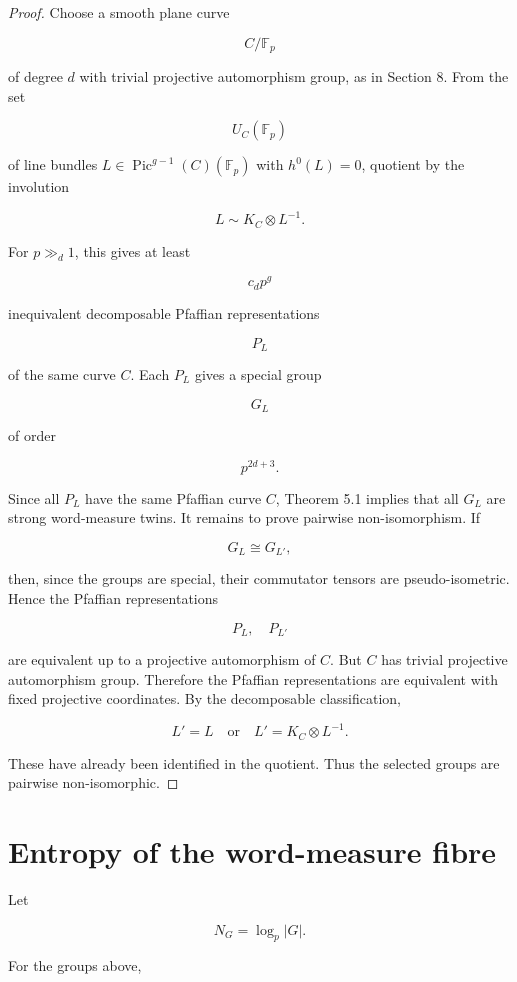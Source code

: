 \documentclass[11pt]{article}
\begin{document}
\begin{proof}
Choose a smooth plane curve

\[
C/\mathbb F_p
\]

of degree $d$ with trivial projective automorphism group, as in Section 8. From the set

\[
U_C(\mathbb F_p)
\]

of line bundles $L\in\operatorname{Pic}^{g-1}(C)(\mathbb F_p)$ with $h^0(L)=0$, quotient by the involution

\[
L\sim K_C\otimes L^{-1}.
\]

For $p\gg_d1$, this gives at least

\[
c_d p^g
\]

inequivalent decomposable Pfaffian representations

\[
P_L
\]

of the same curve $C$. Each $P_L$ gives a special group

\[
G_L
\]

of order

\[
p^{2d+3}.
\]

Since all $P_L$ have the same Pfaffian curve $C$, Theorem 5.1 implies that all $G_L$ are strong word-measure twins. It remains to prove pairwise non-isomorphism. If

\[
G_L\cong G_{L'},
\]

then, since the groups are special, their commutator tensors are pseudo-isometric. Hence the Pfaffian representations

\[
P_L,\quad P_{L'}
\]

are equivalent up to a projective automorphism of $C$. But $C$ has trivial projective automorphism group. Therefore the Pfaffian representations are equivalent with fixed projective coordinates. By the decomposable classification,

\[
L'=L
\quad\text{or}\quad
L'=K_C\otimes L^{-1}.
\]

These have already been identified in the quotient. Thus the selected groups are pairwise non-isomorphic.

\end{proof}

\section{Entropy of the word-measure fibre}

Let

\[
N_G=\log_p|G|.
\]

For the groups above,
\end{document}
